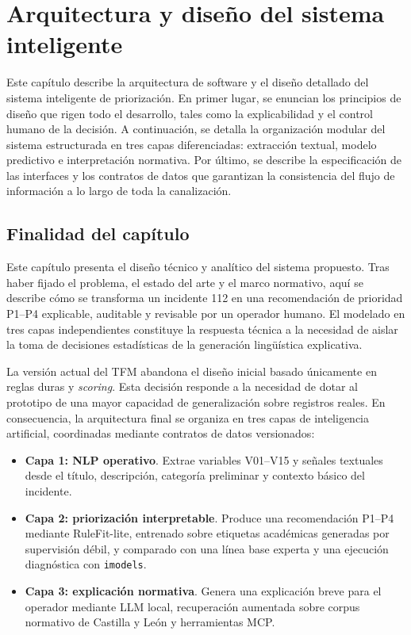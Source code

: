 \chapter{Arquitectura y diseño del sistema inteligente}
\label{cap:6}

Este capítulo describe la arquitectura de software y el diseño detallado del sistema inteligente de priorización. En primer lugar, se enuncian los principios de diseño que rigen todo el desarrollo, tales como la explicabilidad y el control humano de la decisión. A continuación, se detalla la organización modular del sistema estructurada en tres capas diferenciadas: extracción textual, modelo predictivo e interpretación normativa. Por último, se describe la especificación de las interfaces y los contratos de datos que garantizan la consistencia del flujo de información a lo largo de toda la canalización.

\section{Finalidad del capítulo}

Este capítulo presenta el diseño técnico y analítico del sistema propuesto. Tras haber fijado el problema, el estado del arte y el marco normativo, aquí se describe cómo se transforma un incidente 112 en una recomendación de prioridad P1--P4 explicable, auditable y revisable por un operador humano. El modelado en tres capas independientes constituye la respuesta técnica a la necesidad de aislar la toma de decisiones estadísticas de la generación lingüística explicativa.

La versión actual del TFM abandona el diseño inicial basado únicamente en reglas duras y \textit{scoring}. Esta decisión responde a la necesidad de dotar al prototipo de una mayor capacidad de generalización sobre registros reales. En consecuencia, la arquitectura final se organiza en tres capas de inteligencia artificial, coordinadas mediante contratos de datos versionados:

\begin{itemize}
    \item \textbf{Capa 1: NLP operativo}. Extrae variables V01--V15 y señales textuales desde el título, descripción, categoría preliminar y contexto básico del incidente.
    \item \textbf{Capa 2: priorización interpretable}. Produce una recomendación P1--P4 mediante RuleFit-lite, entrenado sobre etiquetas académicas generadas por supervisión débil, y comparado con una línea base experta y una ejecución diagnóstica con \texttt{imodels}.
    \item \textbf{Capa 3: explicación normativa}. Genera una explicación breve para el operador mediante LLM local, recuperación aumentada sobre corpus normativo de Castilla y León y herramientas MCP.
\end{itemize}

